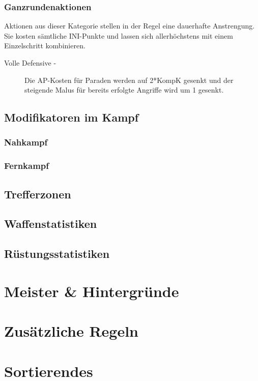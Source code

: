 \documentclass[a4paper,12pt,oneside]{book}
\begin{document}
\section{Ganzrundenaktionen}
Aktionen aus dieser Kategorie stellen in der Regel eine dauerhafte Anstrengung. Sie kosten sämtliche INI-Punkte und lassen sich allerhöchstens mit einem Einzelschritt kombinieren.
\begin{description}
\item[Volle Defensive -] Die AP-Kosten für Paraden werden auf 2*KompK gesenkt und der steigende Malus für bereits erfolgte Angriffe wird um 1 gesenkt.
\end{description}


\chapter{Modifikatoren im Kampf}

\section{Nahkampf}

\section{Fernkampf}

\chapter{Trefferzonen}

\chapter{Waffenstatistiken}

\chapter{Rüstungsstatistiken}
\part{Meister \& Hintergründe}
\setcounter{chapter}{0}
\part{Zusätzliche Regeln}
\setcounter{chapter}{0}

\part{Sortierendes}
\end{document}
